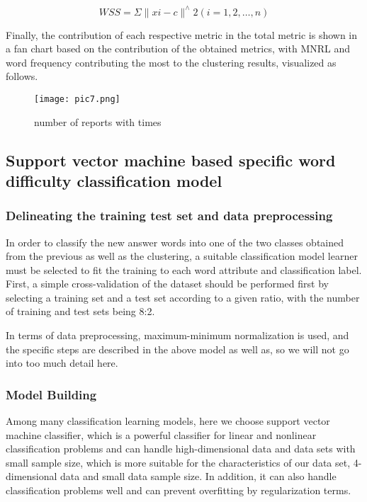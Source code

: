 \documentclass[12pt]{article}  %
\begin{document}
\begin{equation}
WSS=\Sigma\|x i-c\|^{\wedge} 2(i=1,2, \ldots, n)
\end{equation}

Finally, the contribution of each respective metric in the total metric is shown in a fan chart based on the contribution of the obtained metrics, with MNRL and word frequency contributing the most to the clustering results, visualized as follows.
\begin{figure}[H]
	\centering
	\texttt{[image: pic7.png]}
	\caption{number of reports with times}
	\label{img19}
\end{figure}

\subsection{Support vector machine based specific word difficulty classification model} 

\subsubsection{Delineating the training test set and data preprocessing}

In order to classify the new answer words into one of the two classes obtained from the previous as well as the clustering, a suitable classification model learner must be selected to fit the training to each word attribute and classification label.
First, a simple cross-validation of the dataset should be performed first by selecting a training set and a test set according to a given ratio, with the number of training and test sets being 8:2.

In terms of data preprocessing, maximum-minimum normalization is used, and the specific steps are described in the above model as well as, so we will not go into too much detail here.

\subsubsection{Model Building}

Among many classification learning models, here we choose support vector machine classifier, which is a powerful classifier for linear and nonlinear classification problems and can handle high-dimensional data and data sets with small sample size, which is more suitable for the characteristics of our data set, 4-dimensional data and small data sample size. In addition, it can also handle classification problems well and can prevent overfitting by regularization terms.
\end{document}
